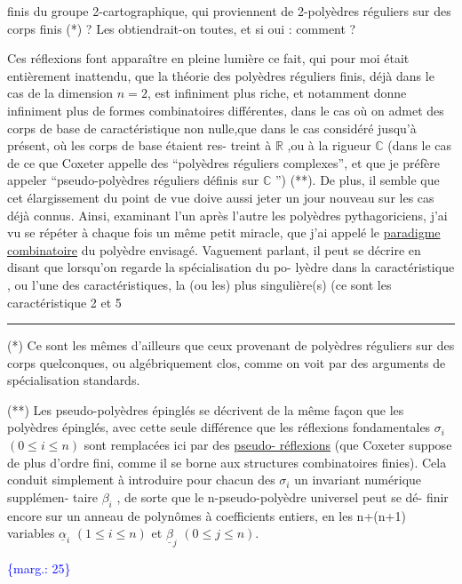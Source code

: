 \documentclass[11pt]{article}
\newcommand{\scanpage}[1]{\par\bigskip\noindent{\small\sffamily[scan #1]}\par}
\newcommand{\mspage}[1]{{\small\sffamily[p.\,#1]}}
\newcommand{\margin}[1]{\textcolor{blue}{\{\textsf{marg.:} #1\}}}
\newcommand{\uline}[1]{\underline{#1}}
\begin{document}
finis du groupe 2-cartographique, qui proviennent de 2-polyèdres
réguliers sur des corps finis (*) ? Les obtiendrait-on toutes,
et si oui : comment ?

Ces réflexions font apparaître en pleine lumière ce fait,
qui pour moi était entièrement inattendu, que la théorie des
polyèdres réguliers finis, déjà dans le cas de la dimension
$n = 2$, est infiniment plus riche, et notamment donne infiniment
plus de formes combinatoires différentes, dans le cas où on admet
des corps de base de caractéristique non nulle,\quad que dans le
cas considéré jusqu'à présent, où les corps de base étaient res-%
treint à $\mathbb{R}$ ,ou à la rigueur $\mathbb{C}$ (dans le cas de ce que Coxeter
appelle des ``polyèdres réguliers complexes'', et que je préfère
appeler ``pseudo-polyèdres réguliers définis sur $\mathbb{C}$ '') (**). De plus,
il semble que cet élargissement du point de vue doive aussi jeter
un jour nouveau sur les cas déjà connus. Ainsi, examinant l'un
après l'autre les polyèdres pythagoriciens, j'ai vu se répéter
à chaque fois un même petit miracle, que j'ai appelé le \uline{paradigme
combinatoire} du polyèdre envisagé. Vaguement parlant, il peut se
décrire en disant que lorsqu'on regarde la spécialisation du po-%
lyèdre dans la caractéristique , ou l'une des caractéristiques, la
(ou les) plus singulière(s) (ce sont les caractéristique 2 et 5

\rule{5cm}{0.4pt}

(*) Ce sont les mêmes d'ailleurs que ceux provenant de polyèdres
réguliers sur des corps quelconques, ou algébriquement clos, comme
on voit par des arguments de spécialisation standards.

(**) Les pseudo-polyèdres épinglés se décrivent de la même façon que
les polyèdres épinglés, avec cette seule différence que les réflexions
fondamentales $\sigma_i$ $(0 \leq i \leq n)$ sont remplacées ici par des \uline{pseudo-%
réflexions} (que Coxeter suppose de plus d'ordre fini, comme il se
borne aux structures combinatoires finies). Cela conduit simplement
à introduire pour chacun des $\sigma_i$ un invariant numérique supplémen-%
taire $\beta_i$ , de sorte que le n-pseudo-polyèdre universel peut se dé-%
finir encore sur un anneau de polynômes à coefficients entiers, en
les n+(n+1) variables $\underline{\alpha}_i$ $(1 \leq i \leq n)$ et $\underline{\beta}_j$ $(0 \leq j \leq n)$.

\margin{25}

\clearpage
\scanpage{119/26}
\mspage{24}
\end{document}
